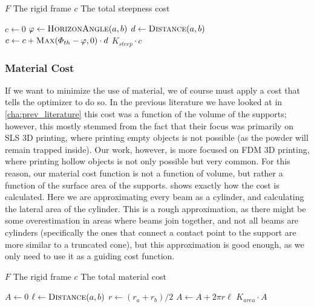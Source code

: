 \begin{algorithm}[ht]
\caption{Support Structure Steepness Cost}
\begin{algorithmic}[1]
    \Require $F$ The rigid frame
    \Ensure $c$ The total steepness cost

        \State $c \gets 0$
         
            \State $\varphi \gets \Call{HorizonAngle}{a, b}$ 
            \State $d \gets \Call{Distance}{a, b}$
            \State $c \gets c + \Call{Max}{\varPhi_{th} - \varphi, 0} \cdot d$ 
        \EndFor
        \State \Return $K_{steep} \cdot c$
    \EndProcedure
\end{algorithmic}
\label{alg:steepness_cost}
\end{algorithm}

\subsubsection{Material Cost}

If we want to minimize the use of material, we of course must apply a cost that tells the optimizer
to do so. In the previous literature we have looked at in \cref{cha:prev_literature}
this cost was a function of the volume of the supports; however, this mostly stemmed from the fact
that their focus was primarily on SLS 3D printing, where printing empty objects is not possible (as the
powder will remain trapped inside). Our work, however, is more focused on FDM 3D printing, where
printing hollow objects is not only possible but very common. For this reason, our material cost function
is not a function of volume, but rather a function of the surface area of the supports.
 shows exactly how the cost is calculated. Here we are approximating
every beam as a cylinder, and calculating the lateral area of the cylinder.
This is a rough approximation, as there might be some overestimation in areas where beams join together,
and not all beams are cylinders (specifically the ones that connect a contact point to the support are
more similar to a truncated cone), but this approximation is good enough, as we only need to use it
as a guiding cost function.

\begin{algorithm}[ht]
\caption{Support Structure Material Cost}
\begin{algorithmic}[1]
    \Require $F$ The rigid frame
    \Ensure $c$ The total material cost

        \State $A \gets 0$
         
            \State $\ell \gets \Call{Distance}{a, b}$ 
            \State $r \gets (r_a + r_b) / 2$ 
            \State $A \gets A + 2\pi r \ell$ 
        \EndFor
        \State \Return $K_{area} \cdot A$
    \EndProcedure
\end{algorithmic}
\label{alg:material_cost}
\end{algorithm}

